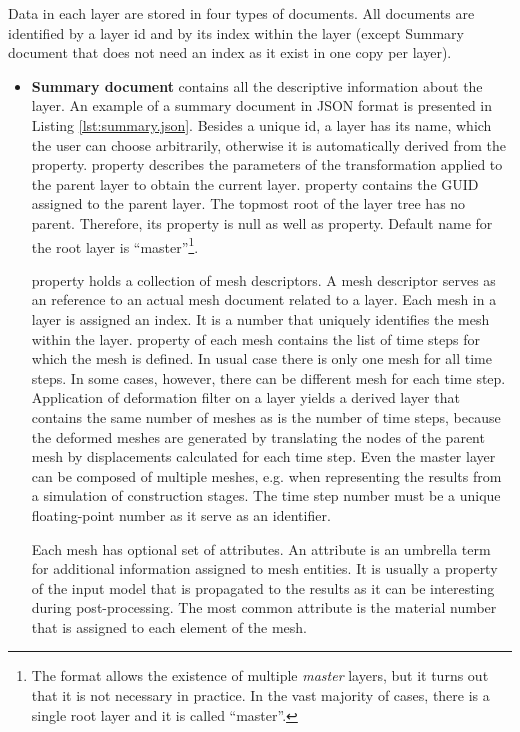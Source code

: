 Data in each layer are stored in four types of documents. All documents are identified by a layer id and by its index within the layer (except Summary document that does not need an index as it exist in one copy per layer).
\begin{itemize}

    \item \textbf{Summary document} contains all the descriptive information about the layer. An example of a summary document in JSON format is presented in Listing \ref{lst:summary.json}. Besides a unique id, a layer has its name, which the user can choose arbitrarily, otherwise it is automatically derived from the  property.  property describes the parameters of the transformation applied to the parent layer to obtain the current layer.  property contains the GUID assigned to the parent layer. The topmost root of the layer tree has no parent. Therefore, its  property is null as well as  property. Default name for the root layer is ``master''\footnote{The format allows the existence of multiple \textit{master} layers, but it turns out that it is not necessary in practice. In the vast majority of cases, there is a single root layer and it is called ``master''.}.

     property holds a collection of mesh descriptors. A mesh descriptor serves as an reference to an actual mesh document related to a layer. Each mesh in a layer is assigned an index. It is a number that uniquely identifies the mesh within the layer.  property of each mesh contains the list of time steps for which the mesh is defined. In usual case there is only one mesh for all time steps. In some cases, however, there can be different mesh for each time step. Application of deformation filter on a layer yields a derived layer that contains the same number of meshes as is the number of time steps, because the deformed meshes are generated by translating the nodes of the parent mesh by displacements calculated for each time step. Even the master layer can be composed of multiple meshes, e.g. when representing the results from a simulation of construction stages. The time step number must be a unique floating-point number as it serve as an identifier.
    
    Each mesh has optional set of attributes. An attribute is an umbrella term for additional information assigned to mesh entities. It is usually a property of the input model that is propagated to the results as it can be interesting during post-processing. The most common attribute is the material number that is assigned to each element of the mesh.


\end{itemize}
